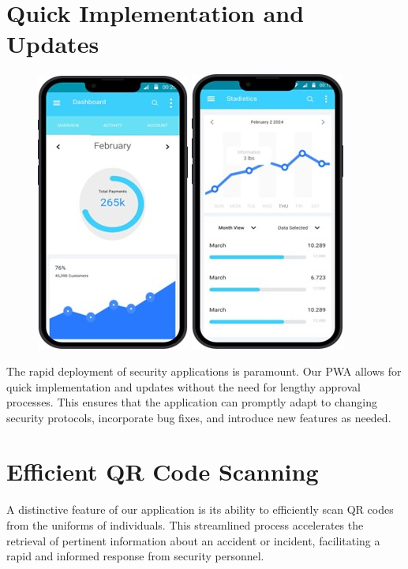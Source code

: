 \documentclass{article}
\begin{document}
	\section{Quick Implementation and Updates}
	\begin{figure}[h]
		\centering
		\includegraphics[width=0.2\linewidth]{images/7.jpg}
		\hspace{0.05\linewidth}
		\includegraphics[width=0.2\linewidth]{images/8.jpg}
		\hspace{0.05\linewidth}
	\end{figure}
	
	The rapid deployment of security applications is paramount. Our PWA allows for quick implementation and updates without the need for lengthy approval processes. This ensures that the application can promptly adapt to changing security protocols, incorporate bug fixes, and introduce new features as needed.
	

	\section{Efficient QR Code Scanning}
	\begin{flushleft}
		A distinctive feature of our application is its ability to efficiently scan QR codes from the uniforms of individuals. This streamlined process accelerates the retrieval of pertinent information about an accident or incident, facilitating a rapid and informed response from security personnel.
	\end{flushleft}
	
\end{document}
